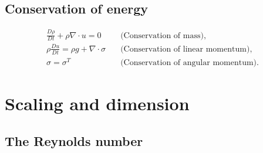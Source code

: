 \subsection{Conservation of energy}
\begin{equation*}
\begin{split}
    \frac{D\rho}{Dt} + \rho\nabla\cdot u = 0 &\quad\text{(Conservation of mass)},\\
    \rho\frac{Du}{Dt} = \rho g + \nabla\cdot\sigma &\quad\text{(Conservation of linear momentum)},\\
    \sigma = \sigma^T &\quad\text{(Conservation of angular momentum)}.
\end{split}
\end{equation*}

\section{Scaling and dimension}
\subsection{The Reynolds number}

